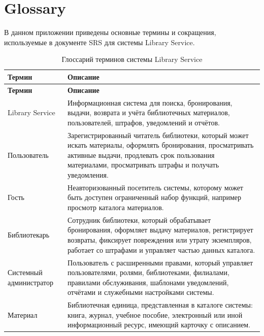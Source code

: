 \documentclass[12pt,a4paper]{article}
\begin{document}
	\appendix
	
	\section{Glossary}
	
	В данном приложении приведены основные термины и сокращения, используемые
	в документе SRS для системы Library Service.
	
	\small
	\begin{xltabular}{\textwidth}{
			|>{\raggedright\arraybackslash}p{4.2cm}
			|>{\raggedright\arraybackslash}X|
		}
		\caption{Глоссарий терминов системы Library Service}
		\label{tab:glossary} \\
		\hline
		\textbf{Термин} & \textbf{Описание} \\
		\hline
		\endfirsthead
		
		\hline
		\textbf{Термин} & \textbf{Описание} \\
		\hline
		\endhead
		
		\hline
		\endfoot
		
		Library Service & Информационная система для поиска, бронирования,
		выдачи, возврата и учёта библиотечных материалов, пользователей,
		штрафов, уведомлений и отчётов. \\
		\hline
		
		Пользователь & Зарегистрированный читатель библиотеки, который может
		искать материалы, оформлять бронирования, просматривать активные
		выдачи, продлевать срок пользования материалами, просматривать штрафы
		и получать уведомления. \\
		\hline
		
		Гость & Неавторизованный посетитель системы, которому может быть
		доступен ограниченный набор функций, например просмотр каталога
		материалов. \\
		\hline
		
		Библиотекарь & Сотрудник библиотеки, который обрабатывает бронирования,
		оформляет выдачу материалов, регистрирует возвраты, фиксирует
		повреждения или утрату экземпляров, работает со штрафами и управляет
		частью данных каталога. \\
		\hline
		
		Системный администратор & Пользователь с расширенными правами,
		который управляет пользователями, ролями, библиотеками, филиалами,
		правилами обслуживания, шаблонами уведомлений, отчётами и служебными
		настройками системы. \\
		\hline
		
		Материал & Библиотечная единица, представленная в каталоге системы:
		книга, журнал, учебное пособие, электронный или иной информационный
		ресурс, имеющий карточку с описанием. \\
		\hline
		

\end{xltabular}
\end{document}
